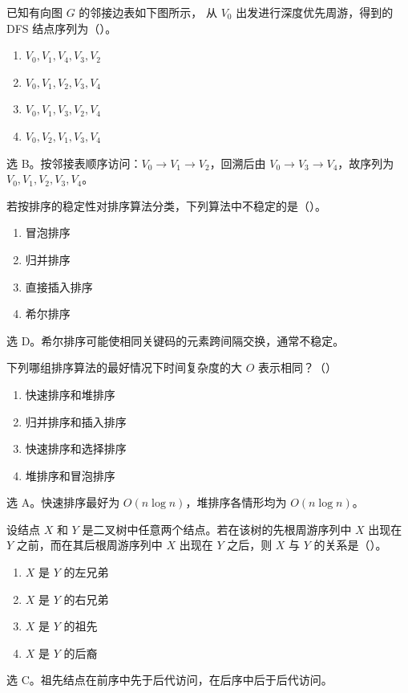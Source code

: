 \begin{question}
已知有向图 $G$ 的邻接边表如下图所示，
从 $V_0$ 出发进行深度优先周游，得到的 DFS 结点序列为（\quad）。
\begin{enumerate}
  \item $V_0,V_1,V_4,V_3,V_2$
  \item $V_0,V_1,V_2,V_3,V_4$
  \item $V_0,V_1,V_3,V_2,V_4$
  \item $V_0,V_2,V_1,V_3,V_4$
\end{enumerate}
\begin{solution}
选 B。按邻接表顺序访问：$V_0\to V_1\to V_2$，回溯后由 $V_0\to V_3\to V_4$，故序列为 $V_0,V_1,V_2,V_3,V_4$。
\end{solution}
\end{question}

\begin{question}
若按排序的稳定性对排序算法分类，下列算法中不稳定的是（\quad）。
\begin{enumerate}
  \item 冒泡排序
  \item 归并排序
  \item 直接插入排序
  \item 希尔排序
\end{enumerate}
\begin{solution}
选 D。希尔排序可能使相同关键码的元素跨间隔交换，通常不稳定。
\end{solution}
\end{question}

\begin{question}
下列哪组排序算法的最好情况下时间复杂度的大 $O$ 表示相同？（\quad）
\begin{enumerate}
  \item 快速排序和堆排序
  \item 归并排序和插入排序
  \item 快速排序和选择排序
  \item 堆排序和冒泡排序
\end{enumerate}
\begin{solution}
选 A。快速排序最好为 $O(n\log n)$，堆排序各情形均为 $O(n\log n)$。
\end{solution}
\end{question}

\begin{question}
设结点 $X$ 和 $Y$ 是二叉树中任意两个结点。若在该树的先根周游序列中 $X$ 出现在 $Y$ 之前，而在其后根周游序列中 $X$ 出现在 $Y$ 之后，则 $X$ 与 $Y$ 的关系是（\quad）。
\begin{enumerate}
  \item $X$ 是 $Y$ 的左兄弟
  \item $X$ 是 $Y$ 的右兄弟
  \item $X$ 是 $Y$ 的祖先
  \item $X$ 是 $Y$ 的后裔
\end{enumerate}
\begin{solution}
选 C。祖先结点在前序中先于后代访问，在后序中后于后代访问。
\end{solution}
\end{question}

